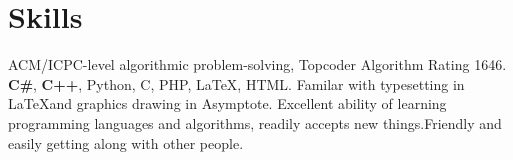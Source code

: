 \documentclass[10pt,a4paper,roman]{moderncv} %
\begin{document}
\section{Skills}
       {ACM/ICPC-level algorithmic problem-solving, Topcoder Algorithm Rating 1646.}
       {\textbf{C\#}, \textbf{C++}, Python, C, PHP, \LaTeX, HTML.} %
       {Familar with typesetting in \LaTeX and graphics drawing in Asymptote.}
       {Excellent ability of learning programming languages and algorithms, readily accepts new things.\newline{}Friendly and easily getting along with other people.}
\end{document}
